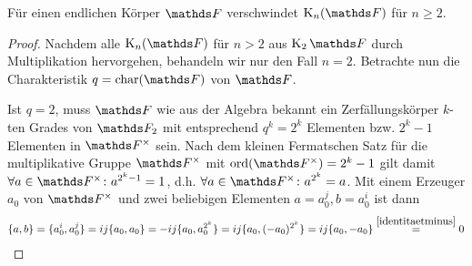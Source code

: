 \documentclass[ngerman,fontsize=11pt, paper=a4, parskip=half, titlepage=true, toc=bib]{scrartcl}
\begin{document}
\begin{Lem}
  Für einen endlichen Körper $\F$ verschwindet $\KnF$ für $n\geq 2$.
  \begin{proof}
    Nachdem alle $\KnF$ für $n>2$ aus $\K_2\F$ durch Multiplikation
    hervorgehen, behandeln wir nur den Fall $n=2$.
    Betrachte nun die Charakteristik $q=\Char(\F)$ von $\F$.

    Ist $q=2$, muss $\F$ wie aus der Algebra bekannt ein
    Zerfällungskörper $k$-ten Grades von $\F_2$ mit entsprechend
    $q^k=2^k$ Elementen bzw. $2^k-1$ Elementen in $\Fx$ sein.
    Nach dem kleinen Fermatschen Satz für die multiplikative Gruppe
    $\Fx$ mit $\Ord(\Fx)=2^k-1$ gilt damit $\forall a\in\Fx\colon a^{2^k-1}=1$, 
    d.h. $\forall a\in\Fx\colon a^{2^k} = a$.
    Mit einem Erzeuger $a_0$ von $\Fx$ und zwei beliebigen Elementen $a=a_0^j,
    b=a_0^i$ ist dann
    \begin{gather*}
      \{a,b\}=\{a_0^i, a_0^j\} = ij\{a_0,a_0\}
      = -ij\{a_0,a_0^{2^k}\} = ij\{a_0, (-a_0)^{2^k}\} =
      ij\{a_0,-a_0\} 
      \overset{\ref{identitaetminus}}{=} 0
    \end{gather*}


\end{proof}
\end{Lem}
\end{document}
